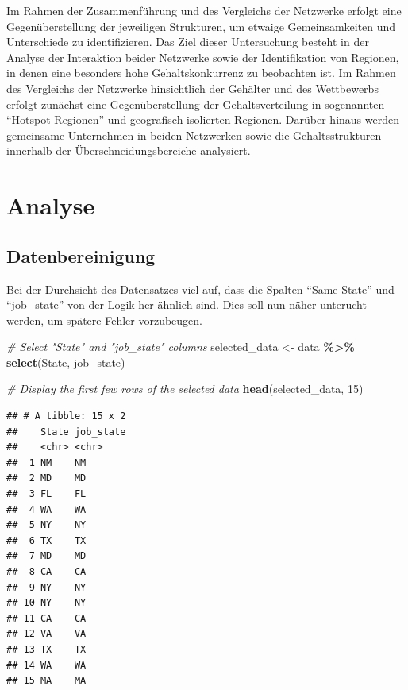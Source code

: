 \documentclass[
]{article}
\newenvironment{Shaded}{\begin{snugshade}}{\end{snugshade}}
\newcommand{\CommentTok}[1]{\textcolor[rgb]{0.56,0.35,0.01}{\textit{#1}}}
\newcommand{\DecValTok}[1]{\textcolor[rgb]{0.00,0.00,0.81}{#1}}
\newcommand{\FunctionTok}[1]{\textcolor[rgb]{0.13,0.29,0.53}{\textbf{#1}}}
\newcommand{\NormalTok}[1]{#1}
\newcommand{\OtherTok}[1]{\textcolor[rgb]{0.56,0.35,0.01}{#1}}
\newcommand{\SpecialCharTok}[1]{\textcolor[rgb]{0.81,0.36,0.00}{\textbf{#1}}}
\begin{document}
Im Rahmen der Zusammenführung und des Vergleichs der Netzwerke erfolgt
eine Gegenüberstellung der jeweiligen Strukturen, um etwaige
Gemeinsamkeiten und Unterschiede zu identifizieren. Das Ziel dieser
Untersuchung besteht in der Analyse der Interaktion beider Netzwerke
sowie der Identifikation von Regionen, in denen eine besonders hohe
Gehaltskonkurrenz zu beobachten ist. Im Rahmen des Vergleichs der
Netzwerke hinsichtlich der Gehälter und des Wettbewerbs erfolgt zunächst
eine Gegenüberstellung der Gehaltsverteilung in sogenannten
``Hotspot-Regionen'' und geografisch isolierten Regionen. Darüber hinaus
werden gemeinsame Unternehmen in beiden Netzwerken sowie die
Gehaltsstrukturen innerhalb der Überschneidungsbereiche analysiert.

\newpage

\section{Analyse}\label{analyse}

\subsection{Datenbereinigung}\label{datenbereinigung}

Bei der Durchsicht des Datensatzes viel auf, dass die Spalten ``Same
State'' und ``job\_state'' von der Logik her ähnlich sind. Dies soll nun
näher unterucht werden, um spätere Fehler vorzubeugen.

\begin{Shaded}
\begin{Highlighting}[]
\CommentTok{\# Select "State" and "job\_state" columns}
\NormalTok{selected\_data }\OtherTok{\textless{}{-}}\NormalTok{ data }\SpecialCharTok{\%\textgreater{}\%}
  \FunctionTok{select}\NormalTok{(State, job\_state)}

\CommentTok{\# Display the first few rows of the selected data}
\FunctionTok{head}\NormalTok{(selected\_data, }\DecValTok{15}\NormalTok{)}
\end{Highlighting}
\end{Shaded}

\begin{verbatim}
## # A tibble: 15 x 2
##    State job_state
##    <chr> <chr>    
##  1 NM    NM       
##  2 MD    MD       
##  3 FL    FL       
##  4 WA    WA       
##  5 NY    NY       
##  6 TX    TX       
##  7 MD    MD       
##  8 CA    CA       
##  9 NY    NY       
## 10 NY    NY       
## 11 CA    CA       
## 12 VA    VA       
## 13 TX    TX       
## 14 WA    WA       
## 15 MA    MA
\end{verbatim}
\end{document}

